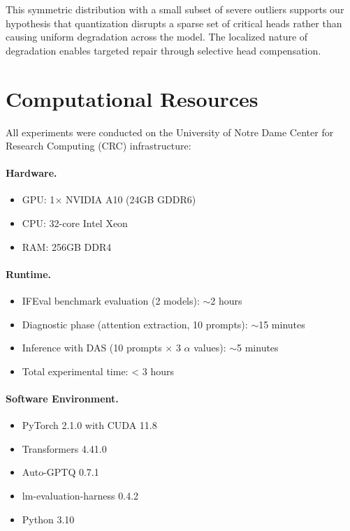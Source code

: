 This symmetric distribution with a small subset of severe outliers supports 
our hypothesis that quantization disrupts a sparse set of critical heads rather 
than causing uniform degradation across the model. The localized nature of 
degradation enables targeted repair through selective head compensation.

\section{Computational Resources}
\label{app:compute}

All experiments were conducted on the University of Notre Dame Center for 
Research Computing (CRC) infrastructure:

\paragraph{Hardware.}
\begin{itemize}
    \item GPU: 1$\times$ NVIDIA A10 (24GB GDDR6)
    \item CPU: 32-core Intel Xeon
    \item RAM: 256GB DDR4
\end{itemize}

\paragraph{Runtime.}
\begin{itemize}
    \item IFEval benchmark evaluation (2 models): $\sim$2 hours
    \item Diagnostic phase (attention extraction, 10 prompts): $\sim$15 minutes
    \item Inference with DAS (10 prompts $\times$ 3 $\alpha$ values): $\sim$5 minutes
    \item Total experimental time: < 3 hours
\end{itemize}

\paragraph{Software Environment.}
\begin{itemize}
    \item PyTorch 2.1.0 with CUDA 11.8
    \item Transformers 4.41.0
    \item Auto-GPTQ 0.7.1
    \item lm-evaluation-harness 0.4.2
    \item Python 3.10
\end{itemize}

